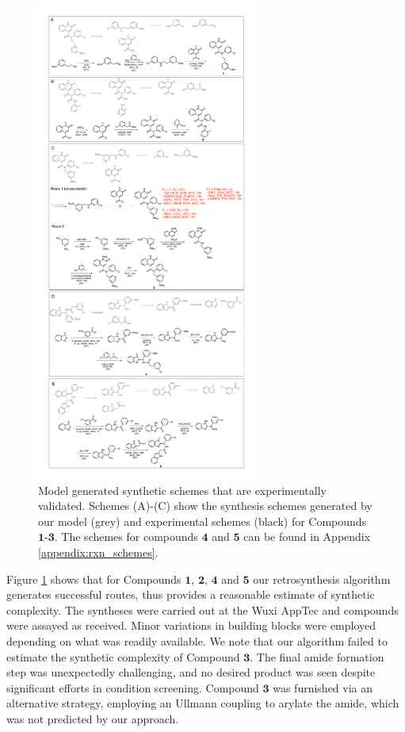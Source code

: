 \begin{figure}[!th]
    \centering
        \includegraphics[width=0.65\textwidth]{Chapters/Ranking/Figs/rxn_schemes_1_to_3.pdf}
        \caption{Model generated synthetic schemes that are experimentally validated. Schemes (A)-(C) show the synthesis schemes generated by our model (grey) and experimental schemes (black) for Compounds $\mathbf{1}$-$\mathbf{3}$. The schemes for compounds $\mathbf{4}$ and $\mathbf{5}$ can be found in Appendix \ref{appendix:rxn_schemes}.}
        \label{fig:synthesis_schemes}
    \end{figure}

Figure \ref{fig:synthesis_schemes} shows that for Compounds $\mathbf{1}$, $\mathbf{2}$, $\mathbf{4}$ and $\mathbf{5}$ our retrosynthesis algorithm generates successful routes, thus provides a reasonable estimate of synthetic complexity. The syntheses were carried out at the Wuxi AppTec and compounds were assayed as received. Minor variations in building blocks were employed depending on what was readily available. We note that our algorithm failed to estimate the synthetic complexity of Compound $\mathbf{3}$. The final amide formation step was unexpectedly challenging, and no desired product was seen despite significant efforts in condition screening. Compound $\mathbf{3}$ was furnished via an alternative strategy, employing an Ullmann coupling to arylate the amide, which was not predicted by our approach. 

